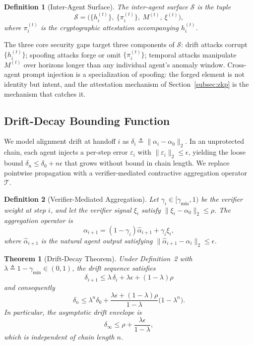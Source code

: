 \documentclass[conference]{IEEEtran}
\newtheorem{theorem}{Theorem}
\newtheorem{definition}{Definition}
\begin{document}
\begin{definition}[Inter-Agent Surface]
The inter-agent surface $\mathcal{S}$ is the tuple
\[
\mathcal{S} = \bigl(\{h_i^{(t)}\},\ \{\pi_i^{(t)}\},\
M^{(t)},\ \xi^{(t)}\bigr),
\]
where $\pi_i^{(t)}$ is the cryptographic attestation accompanying
$h_i^{(t)}$.
\end{definition}

The three core security gaps target three components of $\mathcal{S}$:
drift attacks corrupt $\{h_i^{(t)}\}$; spoofing attacks forge or omit
$\{\pi_i^{(t)}\}$; temporal attacks manipulate $M^{(t)}$ over horizons
longer than any individual agent's anomaly window. Cross-agent prompt
injection is a specialization of spoofing: the forged element is not
identity but intent, and the attestation mechanism of
Section~\ref{subsec:zkp} is the mechanism that catches it.

\subsection{Drift-Decay Bounding Function}
\label{subsec:drift}

We model alignment drift at handoff $i$ as
$\delta_i \triangleq \|\alpha_i - \alpha_0\|_2$. In an unprotected
chain, each agent injects a per-step error $\varepsilon_i$ with
$\|\varepsilon_i\|_2 \leq \epsilon$, yielding the loose bound
$\delta_n \leq \delta_0 + n\epsilon$ that grows without bound in
chain length. We replace pointwise propagation with a verifier-mediated
contractive aggregation operator $\mathcal{T}$.

\begin{definition}[Verifier-Mediated Aggregation]
Let $\gamma_i \in [\gamma_{\min}, 1)$ be the verifier weight at step
$i$, and let the verifier signal $\xi_i$ satisfy
$\|\xi_i - \alpha_0\|_2 \leq \rho$. The aggregation operator is
\begin{equation}
\alpha_{i+1} = (1-\gamma_i)\hat{\alpha}_{i+1} + \gamma_i \xi_i,
\end{equation}
where $\hat{\alpha}_{i+1}$ is the natural agent output satisfying
$\|\hat{\alpha}_{i+1} - \alpha_i\|_2 \leq \epsilon$.
\end{definition}

\begin{theorem}[Drift-Decay Theorem]
Under Definition~2 with $\lambda \triangleq 1 - \gamma_{\min} \in (0,1)$,
the drift sequence satisfies
\begin{equation}
\delta_{i+1} \leq \lambda\,\delta_i + \lambda\epsilon +
(1-\lambda)\rho
\end{equation}
and consequently
\begin{equation}
\delta_n \leq \lambda^n \delta_0 +
\frac{\lambda\epsilon + (1-\lambda)\rho}{1-\lambda}
\bigl(1-\lambda^n\bigr).
\end{equation}
In particular, the asymptotic drift envelope is
\begin{equation}
\delta_\infty \leq \rho + \frac{\lambda\epsilon}{1-\lambda},
\end{equation}
which is \emph{independent of chain length $n$}.
\end{theorem}
\end{document}
